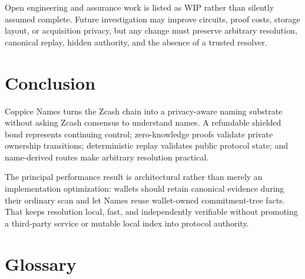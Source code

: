 \documentclass[11pt]{article}
\begin{document}
Open engineering and assurance work is listed as WIP rather than silently
assumed complete. Future investigation may improve circuits, proof costs,
storage layout, or acquisition privacy, but any change must preserve
arbitrary resolution, canonical replay, hidden authority, and the absence of
a trusted resolver.

\section{Conclusion}

Coppice Names turns the Zcash chain into a privacy-aware naming substrate
without asking Zcash consensus to understand names. A refundable shielded
bond represents continuing control; zero-knowledge proofs validate private
ownership transitions; deterministic replay validates public protocol state;
and name-derived routes make arbitrary resolution practical.

The principal performance result is architectural rather than merely an
implementation optimization: wallets should retain canonical evidence during
their ordinary scan and let Names reuse wallet-owned commitment-tree facts.
That keeps resolution local, fast, and independently verifiable without
promoting a third-party service or mutable local index into protocol
authority.

\section*{Glossary}
\end{document}
